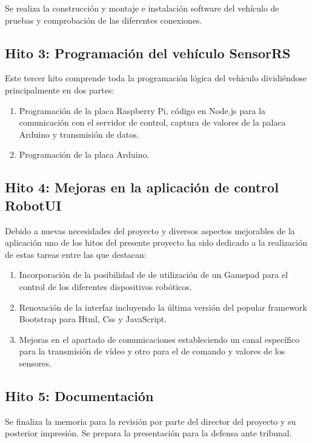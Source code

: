 Se realiza la construcción y montaje e instalación software del vehículo de pruebas y comprobación de las diferentes conexiones.

\subsection{Hito 3: Programación del vehículo SensorRS }
\label{subsec:hito3}

Este tercer hito comprende toda la programación lógica del vehículo dividiéndose principalmente en dos partes:

\begin{enumerate}
 \item Programación de la placa Raspberry Pi, código en Node.js para la comunicación con el servidor de control, captura de valores de la palaca Arduino y transmisión de datos.
 \item Programación de la placa Arduino.
\end{enumerate}

\subsection{Hito 4: Mejoras en la aplicación de control RobotUI }
\label{subsec:hito6}

Debido a nuevas necesidades del proyecto y diversos aspectos mejorables de la aplicación uno de los hitos del presente proyecto ha sido dedicado a la realización de estas tareas entre las que destacan:\\

\begin{enumerate}
 \item Incorporación de la posibilidad de de utilización de un Gamepad para el control de los diferentes dispositivos robóticos.
 \item Renovación de la interfaz incluyendo la última versión del popular framework Bootstrap para Html, Css y JavaScript.
 \item Mejoras en el apartado de comunicaciones estableciendo un canal específico para la transmisión de vídeo y otro para el de comando y valores de los sensores.
\end{enumerate}


\subsection{Hito 5: Documentación }
\label{subsec:hito6}

Se finaliza la memoria para la revisión por parte del director del proyecto y su posterior impresión. Se prepara la presentación para la defensa ante tribunal.


